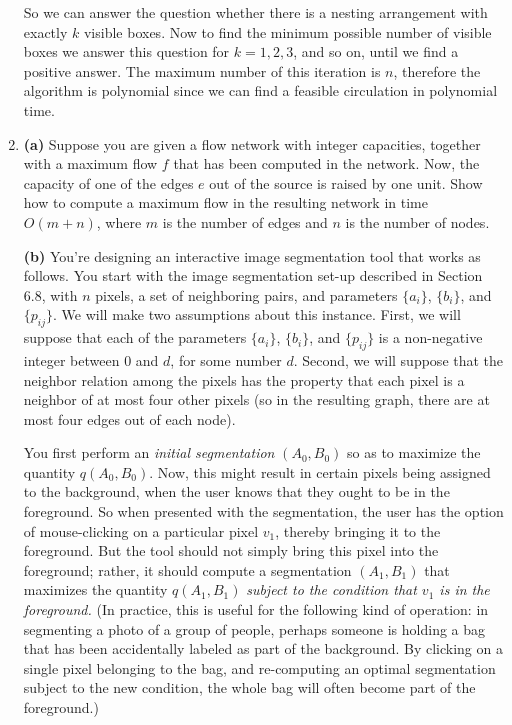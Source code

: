 \documentclass[12pt]{article}
\begin{document}
\begin{enumerate}
{\bigskip

So we can answer the question whether there is
a nesting arrangement with exactly $k$ visible boxes.
Now to find the minimum possible number of visible boxes we answer
this question for $k=1,2,3$, and so on, until we find a positive answer.
The maximum number of this iteration is $n$, therefore the algorithm is
polynomial since we can find a feasible circulation in polynomial time.

}


\item

{\bf (a)}
Suppose you are given a flow network with integer capacities,
together with a maximum flow $f$ that has been computed in the network.
Now, the capacity of one of the edges $e$ out of the source
is raised by one unit.
Show how to compute a maximum flow in the resulting network
in time $O(m + n)$, where $m$ is the number of edges
and $n$ is the number of nodes.

{\bf (b)}
You're designing an interactive image segmentation tool
that works as follows.
You start with the image segmentation set-up described in Section 6.8,
with $n$ pixels, a set of neighboring pairs, and parameters
$\{a_i\}$, $\{b_i\}$, and $\{p_{ij}\}$.
We will make two assumptions about this instance.
First, we will suppose that each of the parameters
$\{a_i\}$, $\{b_i\}$, and $\{p_{ij}\}$
is a non-negative integer between $0$ and $d$,
for some number $d$.
Second, we will suppose that the neighbor relation
among the pixels has the property
that each pixel is a neighbor of at most four other pixels
(so in the resulting graph, there are at most four edges out of each node).

You first perform an {\em initial segmentation} $(A_0,B_0)$
so as to maximize the quantity $q(A_0,B_0)$.
Now, this might result in certain pixels
being assigned to the background, when the user
knows that they ought to be in the foreground.
So when presented with the segmentation, the user has
the option of mouse-clicking on a particular pixel $v_1$,
thereby bringing it to the foreground.
But the tool should not simply bring this pixel
into the foreground;
rather, it should compute a segmentation $(A_1,B_1)$
that maximizes the quantity $q(A_1,B_1)$
{\em subject to the condition that $v_1$ is in the foreground.}
(In practice, this is useful for the following kind of operation:
in segmenting a photo of a group of people, perhaps someone is holding a bag
that has been accidentally labeled as part of the background.
By clicking on a single pixel belonging to the bag,
and re-computing an optimal segmentation subject to the new condition,
the whole bag will often become part of the foreground.)


\end{enumerate}
\end{document}
